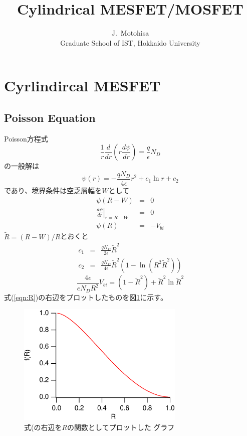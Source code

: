 \documentclass[11pt,uplatex]{jsarticle}
\def\d#1#2{\frac{d #1}{d #2}}
\begin{document}
\title{Cylindrical MESFET/MOSFET}
\author{J.~Motohisa\\Graduate School of IST, Hokkaido University}
\maketitle

\section{Cyrlindircal MESFET}
\subsection{Poisson Equation}
Poisson方程式
\begin{equation}
 \frac{1}{r} \d{}{r}(r\d{\psi}{r}) = \frac{q}{\epsilon} N_D
\end{equation}
の一般解は
\begin{equation}
\psi(r) = -\frac{q N_D}{4 \epsilon }r^2 +c_1 \ln r + c_2
\end{equation}
であり、境界条件は空乏層幅を$W$として
\begin{eqnarray}
 \psi(R-W)&=&0 \\
 \left. \d{\psi}{r}\right|_{r=R-W}&=&0\\
 \psi(R)&=&-V_{bi}
\end{eqnarray}
$\tilde{R}=(R-W)/R$とおくと
\begin{eqnarray}
c_1 &=& \frac{q N_D}{2 \epsilon} \tilde{R}^2 \\
c_2& =& \frac{q N_D}{4 \epsilon}\tilde{R}^2 (1-\ln (R^2\tilde{R}^2))
\end{eqnarray}
\begin{equation}
 \frac{4 \epsilon}{e N_D R^2} V_{bi} = (1-\tilde{R}^2)+\tilde{R}^2 \ln \tilde{R}^2\label{eqn:R}
\end{equation}
式(\ref{eqn:R})の右辺をプロットしたものを図\ref{fig:rgraph}に示す。

\begin{figure}[htbp]
 \begin{center}
  \includegraphics[width=8cm,keepaspectratio]{Rgraph.eps}
  \caption{式(\protect{\ref{eqn:R})}の右辺を$R$の関数としてプロットした
  グラフ\label{fig:rgraph}}
  \end{center}
 \end{figure}
\end{document}
